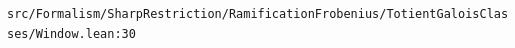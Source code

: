 \nolinkurl{src/Formalism/SharpRestriction/RamificationFrobenius/TotientGaloisClasses/Window.lean:30}%
